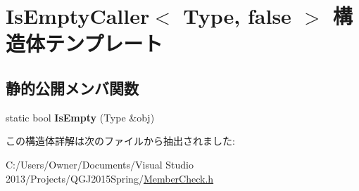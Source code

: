 \hypertarget{struct_is_empty_caller_3_01_type_00_01false_01_4}{}\section{Is\+Empty\+Caller$<$ Type, false $>$ 構造体テンプレート}
\label{struct_is_empty_caller_3_01_type_00_01false_01_4}
\subsection*{静的公開メンバ関数}
\begin{DoxyCompactItemize}
\item 
static bool {\bfseries Is\+Empty} (Type \&obj)\hypertarget{struct_is_empty_caller_3_01_type_00_01false_01_4_a9cf15109affc06867236aa6f5c4ce38d}{}\label{struct_is_empty_caller_3_01_type_00_01false_01_4_a9cf15109affc06867236aa6f5c4ce38d}

\end{DoxyCompactItemize}


この構造体詳解は次のファイルから抽出されました\+:\begin{DoxyCompactItemize}
\item 
C\+:/\+Users/\+Owner/\+Documents/\+Visual Studio 2013/\+Projects/\+Q\+G\+J2015\+Spring/\hyperlink{_member_check_8h}{Member\+Check.\+h}\end{DoxyCompactItemize}

